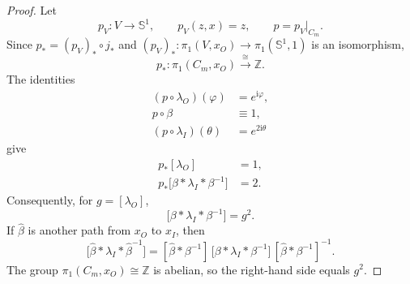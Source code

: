 \documentclass[11pt,reqno]{amsart}
\theoremstyle{definition}
\numberwithin{equation}{section}
\begin{document}
\begin{proof}
Let
\[
 p_V:V\longrightarrow\mathbb S^1,
 \qquad p_V(z,x)=z,
 \qquad p=p_V|_{C_m}.
\]
Since $p_*=(p_V)_*\circ j_*$ and
$(p_V)_*:\pi_1(V,x_O)\to\pi_1(\mathbb S^1,1)$ is an isomorphism,
\[
 p_*:\pi_1(C_m,x_O)\xrightarrow{\ \cong\ }\mathbb Z.
\]
The identities
\begin{align*}
 (p\circ\lambda_O)(\varphi)&=e^{\mathrm i\varphi},\\
 p\circ\beta&\equiv1,\\
 (p\circ\lambda_I)(\theta)&=e^{2\mathrm i\theta}
\end{align*}
give
\begin{align*}
 p_*[\lambda_O]&=1,\\
 p_*\bigl[\beta*\lambda_I*\beta^{-1}\bigr]&=2.
\end{align*}
Consequently, for $g=[\lambda_O]$,
\[
 \bigl[\beta*\lambda_I*\beta^{-1}\bigr]=g^2.
\]
If $\widehat\beta$ is another path from $x_O$ to $x_I$, then
\[
 \bigl[\widehat\beta*\lambda_I*\widehat\beta^{-1}\bigr]
 =
 [\widehat\beta*\beta^{-1}]\,
 \bigl[\beta*\lambda_I*\beta^{-1}\bigr]\,
 [\widehat\beta*\beta^{-1}]^{-1}.
\]
The group $\pi_1(C_m,x_O)\cong\mathbb Z$ is abelian, so the right-hand
side equals $g^2$.


\end{proof}
\end{document}

